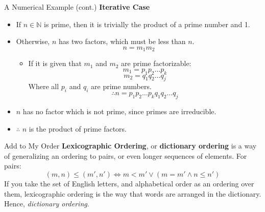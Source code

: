 \documentclass[11pt]{beamer}
\begin{document}
\begin{frame}[fragile=singleslide]{A Numerical Example (cont.)}
\textbf{Iterative Case} \\ 
\begin{itemize}
\item If $n \in \mathbb{N}$ is prime, then it is trivially the product of a prime number and 1.  
\item Otherwise, $n$ has two factors, which must be less than $n$. 
\begin{equation}
n = m_1m_2 
\end{equation}
\vspace{-1.2em}
\begin{itemize}
\item If it is given that $m_1$ and $m_2$ are prime factorizable:
\begin{equation}
m_1 = p_1p_2 \dots p_k
\end{equation}
\begin{equation}
m_2 = q_1q_2 \dots q_j
\end{equation}
Where all $p_i$ and $q_i$ are prime numbers. 
\begin{equation}
\therefore n = p_1p_2 \dots p_kq_1q_2 \dots q_j
\end{equation}
\end{itemize} 
\item $n$ has no factor which is not prime, since primes are irreducible. 
\item $\therefore$ $n$ is the product of prime factors.
\end{itemize}
\end{frame}

\begin{frame}[fragile=singleslide]{Add to My Order}
\textbf{Lexicographic Ordering}, or \textbf{dictionary ordering} is a way of generalizing an ordering to pairs, or even longer sequences of elements.  For pairs:
\begin{equation}
(m, n) \leq (m', n') \iff m < m' \lor (m = m' \land n \leq n')
\end{equation}
If you take the set of English letters, and alphabetical order as an ordering over them, lexicographic ordering is the way that words are arranged in the dictionary.  Hence, \emph{dictionary ordering}. 
\end{frame}
\end{document}

